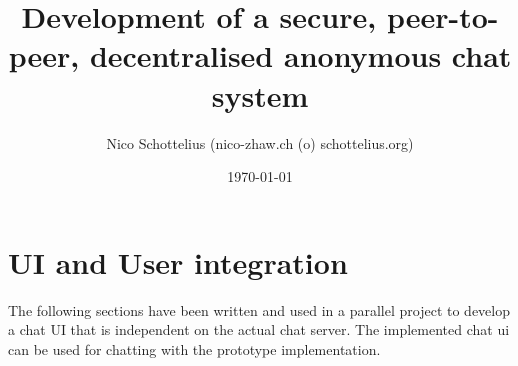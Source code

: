 \documentclass[12pt,a4paper]{report}
\begin{document}
\title{Development of a secure, peer-to-peer, decentralised anonymous chat system}
\date{\today}
\author{Nico Schottelius (nico-zhaw.ch (o) schottelius.org)}
\maketitle
\newpage
\tableofcontents
\listoftables
\listoffigures
\newpage


















\appendix
\chapter{UI and User integration}
The following sections have been written and used in a parallel project to
develop a chat UI that is independent on the actual chat server.
The implemented chat ui can be used for chatting with the prototype
implementation.
\label{chatui}



\end{document}
